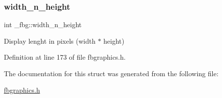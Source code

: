 \mbox{\label{struct__fbg_a1ab3f10e8c3483d7286db9850511d46d}} 
\subsubsection{\texorpdfstring{width\+\_\+n\+\_\+height}{width\_n\_height}}
{\footnotesize\ttfamily int \+\_\+fbg\+::width\+\_\+n\+\_\+height}



Display lenght in pixels (width $\ast$ height) 



Definition at line 173 of file fbgraphics.\+h.



The documentation for this struct was generated from the following file\+:\begin{DoxyCompactItemize}
\item 
\mbox{\hyperlink{fbgraphics_8h}{fbgraphics.\+h}}\end{DoxyCompactItemize}

